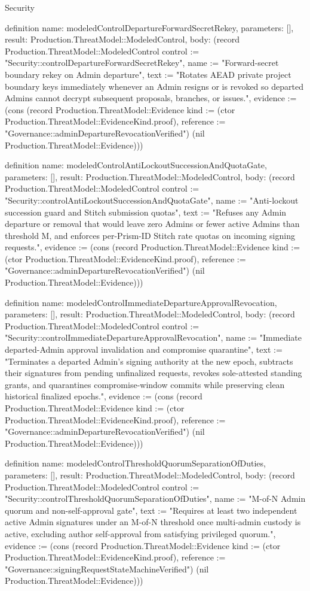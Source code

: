 \begin{lexlean}{Security}
\begin{semanticmodule}
definition{
  name: modeledControlDepartureForwardSecretRekey,
  parameters: [],
  result: Production.ThreatModel::ModeledControl,
  body: (record Production.ThreatModel::ModeledControl {control := "Security::controlDepartureForwardSecretRekey", name := "Forward-secret boundary rekey on Admin departure", text := "Rotates AEAD private project boundary keys immediately whenever an Admin resigns or is revoked so departed Admins cannot decrypt subsequent proposals, branches, or issues.", evidence := (cons (record Production.ThreatModel::Evidence {kind := (ctor Production.ThreatModel::EvidenceKind.proof), reference := "Governance::adminDepartureRevocationVerified"}) (nil Production.ThreatModel::Evidence))})
}

definition{
  name: modeledControlAntiLockoutSuccessionAndQuotaGate,
  parameters: [],
  result: Production.ThreatModel::ModeledControl,
  body: (record Production.ThreatModel::ModeledControl {control := "Security::controlAntiLockoutSuccessionAndQuotaGate", name := "Anti-lockout succession guard and Stitch submission quotas", text := "Refuses any Admin departure or removal that would leave zero Admins or fewer active Admins than threshold M, and enforces per-Prism-ID Stitch rate quotas on incoming signing requests.", evidence := (cons (record Production.ThreatModel::Evidence {kind := (ctor Production.ThreatModel::EvidenceKind.proof), reference := "Governance::adminDepartureRevocationVerified"}) (nil Production.ThreatModel::Evidence))})
}

definition{
  name: modeledControlImmediateDepartureApprovalRevocation,
  parameters: [],
  result: Production.ThreatModel::ModeledControl,
  body: (record Production.ThreatModel::ModeledControl {control := "Security::controlImmediateDepartureApprovalRevocation", name := "Immediate departed-Admin approval invalidation and compromise quarantine", text := "Terminates a departed Admin's signing authority at the new epoch, subtracts their signatures from pending unfinalized requests, revokes sole-attested standing grants, and quarantines compromise-window commits while preserving clean historical finalized epochs.", evidence := (cons (record Production.ThreatModel::Evidence {kind := (ctor Production.ThreatModel::EvidenceKind.proof), reference := "Governance::adminDepartureRevocationVerified"}) (nil Production.ThreatModel::Evidence))})
}

definition{
  name: modeledControlThresholdQuorumSeparationOfDuties,
  parameters: [],
  result: Production.ThreatModel::ModeledControl,
  body: (record Production.ThreatModel::ModeledControl {control := "Security::controlThresholdQuorumSeparationOfDuties", name := "M-of-N Admin quorum and non-self-approval gate", text := "Requires at least two independent active Admin signatures under an M-of-N threshold once multi-admin custody is active, excluding author self-approval from satisfying privileged quorum.", evidence := (cons (record Production.ThreatModel::Evidence {kind := (ctor Production.ThreatModel::EvidenceKind.proof), reference := "Governance::signingRequestStateMachineVerified"}) (nil Production.ThreatModel::Evidence))})
}


\end{semanticmodule}
\end{lexlean}
